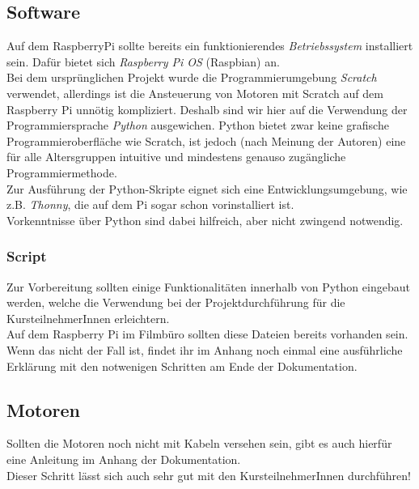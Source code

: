 \subsection{Software}
Auf dem RaspberryPi sollte bereits ein funktionierendes \emph{Betriebssystem} installiert sein. Dafür bietet sich \emph{Raspberry Pi OS} (Raspbian) an. \\

Bei dem ursprünglichen Projekt wurde die Programmierumgebung \emph{Scratch} verwendet, allerdings ist die Ansteuerung von Motoren mit Scratch auf dem Raspberry Pi  unnötig kompliziert. Deshalb sind wir hier auf die Verwendung der Programmiersprache \emph{Python} ausgewichen. Python bietet zwar keine grafische Programmieroberfläche wie Scratch, ist jedoch (nach Meinung der Autoren) eine für alle Altersgruppen intuitive und mindestens genauso zugängliche Programmiermethode.\\

Zur Ausführung der Python-Skripte eignet sich eine Entwicklungsumgebung, wie z.B. \emph{Thonny}, die auf dem Pi sogar schon vorinstalliert ist.\\
Vorkenntnisse über Python sind dabei hilfreich, aber nicht zwingend notwendig.

\subsubsection{Script}
Zur Vorbereitung sollten einige Funktionalitäten innerhalb von Python eingebaut werden, welche die Verwendung bei der Projektdurchführung für die KursteilnehmerInnen erleichtern.\\
Auf dem Raspberry Pi im Filmbüro sollten diese Dateien bereits vorhanden sein. Wenn das nicht der Fall ist, findet ihr im Anhang noch einmal eine ausführliche Erklärung mit den notwenigen Schritten am Ende der Dokumentation.\\


\subsection{Motoren}
Sollten die Motoren noch nicht mit Kabeln versehen sein, gibt es auch hierfür eine Anleitung im Anhang der Dokumentation.\\
Dieser Schritt lässt sich auch sehr gut mit den KursteilnehmerInnen durchführen!
